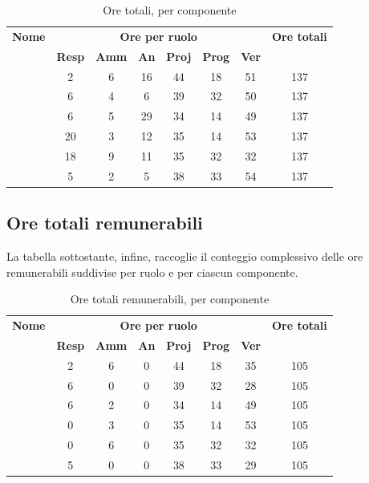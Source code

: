 \begin{table}[H]
	\begin{center}
		\begin{tabular}{|c|c|c|c|c|c|c|c|}
			\hline
			\textbf{Nome} & \multicolumn{6}{c|}{\textbf{Ore per ruolo}} & \textbf{Ore totali} \\\cline{2-7}
			& \textbf{Resp} & \textbf{Amm} & \textbf{An} & \textbf{Proj} & \textbf{Prog} & \textbf{Ver} & \\
			\hline
			\MC			&	2	&	6	&	16	&	44	&	18	&	51	&	137	\\
			\hline
			\AN			&	6	&	4	&	6	&	39	&	32	&	50	& 	137	\\
			\hline
			\DAN		&	6	&	5	&	29	&	34	&	14	&	49	&	137	\\
			\hline
			\AS			&	20	&	3 	&	12 	&	35	&	14 	& 	53	&	137	\\
			\hline
			\NS 		&	18	&	9	&	11	&	35	&	32	& 	32	&	137	\\
			\hline
			\DS			& 	5	&	2	&	5	&	38	&	33	&	54	&	137	\\
			\hline
		\end{tabular}
	\end{center}
	\caption{Ore totali, per componente}
\end{table}

\subsection{Ore totali remunerabili}
La tabella sottostante, infine, raccoglie il conteggio complessivo delle ore remunerabili suddivise per ruolo e per ciascun componente.

\begin{table}[H]
	\begin{center}
		\begin{tabular}{|c|c|c|c|c|c|c|c|}
			\hline
			\textbf{Nome} & \multicolumn{6}{c|}{\textbf{Ore per ruolo}} & \textbf{Ore totali} \\\cline{2-7}
			& \textbf{Resp} & \textbf{Amm} & \textbf{An} & \textbf{Proj} & \textbf{Prog} & \textbf{Ver} & \\
			\hline
			\MC			&	2	&	6	&	0	&	44	&	18	&	35	&	105	\\
			\hline
			\AN			&	6	&	0	&	0	&	39	&	32	&	28	& 	105	\\
			\hline
			\DAN		&	6	&	2	&	0	&	34	&	14	&	49	&	105	\\
			\hline
			\AS			&	0	&	3 	&	0 	&	35	&	14 	& 	53	&	105	\\
			\hline
			\NS 		&	0	&	6	&	0	&	35	&	32	& 	32	&	105	\\
			\hline
			\DS			& 	5	&	0	&	0	&	38	&	33	&	29	&	105	\\
			\hline
		\end{tabular}
	\end{center}
	\caption{Ore totali remunerabili, per componente}
\end{table}

